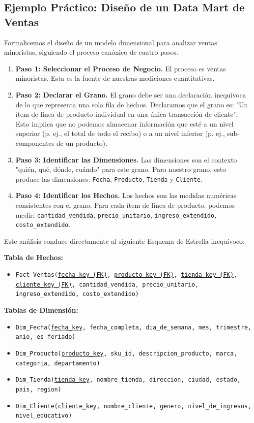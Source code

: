 \documentclass{article}
\begin{document}
\subsection{Ejemplo Práctico: Diseño de un Data Mart de Ventas}
Formalicemos el diseño de un modelo dimensional para analizar ventas minoristas, siguiendo el proceso canónico de cuatro pasos.

\begin{enumerate}
    \item \textbf{Paso 1: Seleccionar el Proceso de Negocio.} El proceso es ventas minoristas. Esta es la fuente de nuestras mediciones cuantitativas.
    \item \textbf{Paso 2: Declarar el Grano.} El grano debe ser una declaración inequívoca de lo que representa una sola fila de hechos. Declaramos que el grano es: "Un ítem de línea de producto individual en una única transacción de cliente". Esto implica que no podemos almacenar información que esté a un nivel superior (p. ej., el total de todo el recibo) o a un nivel inferior (p. ej., sub-componentes de un producto).
    \item \textbf{Paso 3: Identificar las Dimensiones.} Las dimensiones son el contexto "quién, qué, dónde, cuándo" para este grano. Para nuestro grano, esto produce las dimensiones: \texttt{Fecha}, \texttt{Producto}, \texttt{Tienda} y \texttt{Cliente}.
    \item \textbf{Paso 4: Identificar los Hechos.} Los hechos son las medidas numéricas consistentes con el grano. Para cada ítem de línea de producto, podemos medir: \texttt{cantidad\_vendida}, \texttt{precio\_unitario}, \texttt{ingreso\_extendido}, \texttt{costo\_extendido}.
\end{enumerate}

\noindent Este análisis conduce directamente al siguiente Esquema de Estrella inequívoco:

\noindent\textbf{Tabla de Hechos:}
\begin{itemize}
    \item \texttt{Fact\_Ventas(\underline{fecha\_key (FK)}, \underline{producto\_key (FK)}, \underline{tienda\_key (FK)}, \underline{cliente\_key (FK)}, cantidad\_vendida, precio\_unitario, ingreso\_extendido, costo\_extendido)}
\end{itemize}
\noindent\textbf{Tablas de Dimensión:}
\begin{itemize}
    \item \texttt{Dim\_Fecha(\underline{fecha\_key}, fecha\_completa, dia\_de\_semana, mes, trimestre, anio, es\_feriado)}
    \item \texttt{Dim\_Producto(\underline{producto\_key}, sku\_id, descripcion\_producto, marca, categoria, departamento)}
    \item \texttt{Dim\_Tienda(\underline{tienda\_key}, nombre\_tienda, direccion, ciudad, estado, pais, region)}
    \item \texttt{Dim\_Cliente(\underline{cliente\_key}, nombre\_cliente, genero, nivel\_de\_ingresos, nivel\_educativo)}
\end{itemize}
\end{document}
